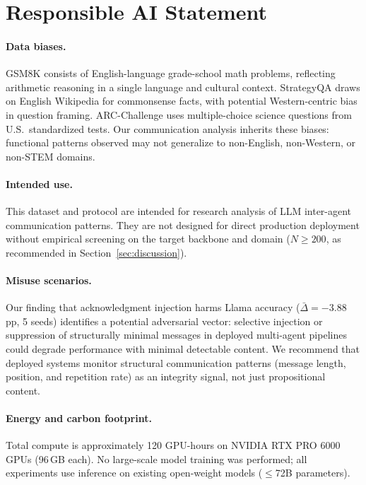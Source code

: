 \section*{Responsible AI Statement}
\label{app:rai}

\paragraph{Data biases.}
GSM8K consists of English-language grade-school math problems, reflecting arithmetic reasoning in a single language and cultural context. StrategyQA draws on English Wikipedia for commonsense facts, with potential Western-centric bias in question framing. ARC-Challenge uses multiple-choice science questions from U.S.\ standardized tests. Our communication analysis inherits these biases: functional patterns observed may not generalize to non-English, non-Western, or non-STEM domains.

\paragraph{Intended use.}
This dataset and protocol are intended for research analysis of LLM inter-agent communication patterns. They are not designed for direct production deployment without empirical screening on the target backbone and domain ($N \geq 200$, as recommended in Section~\ref{sec:discussion}).

\paragraph{Misuse scenarios.}
Our finding that acknowledgment injection harms Llama accuracy ($\bar{\Delta} = -3.88$\,pp, 5 seeds) identifies a potential adversarial vector: selective injection or suppression of structurally minimal messages in deployed multi-agent pipelines could degrade performance with minimal detectable content. We recommend that deployed systems monitor structural communication patterns (message length, position, and repetition rate) as an integrity signal, not just propositional content.

\paragraph{Energy and carbon footprint.}
Total compute is approximately 120 GPU-hours on NVIDIA RTX PRO 6000 GPUs (96\,GB each). No large-scale model training was performed; all experiments use inference on existing open-weight models ($\leq$72B parameters).

